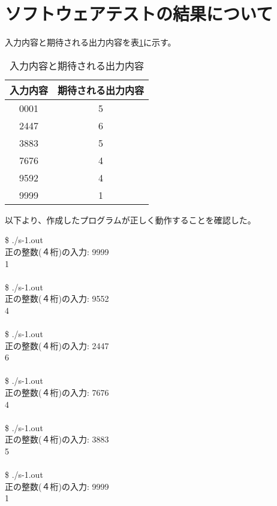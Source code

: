 

\section{ソフトウェアテストの結果について}
入力内容と期待される出力内容を表\ref{入力内容と期待される出力内容}に示す。

\begin{table}[H]
    \centering
    \caption{入力内容と期待される出力内容}
    \label{入力内容と期待される出力内容}
        \begin{tabular}{|c|c|} \hline
            入力内容 & 期待される出力内容 \\ \hline
            0001 & 5 \\
            2447 & 6 \\
            3883 & 5 \\
            7676 & 4 \\
            9592 & 4 \\
            9999 & 1 \\ \hline
        \end{tabular}
\end{table}

以下より、作成したプログラムが正しく動作することを確認した。

\$ ./s-1.out \\
正の整数(４桁)の入力: 9999 \\
1 \\
\\
\$ ./s-1.out \\ 
正の整数(４桁)の入力: 9552 \\ 
4 \\
\\
\$ ./s-1.out \\
正の整数(４桁)の入力: 2447 \\
6 \\
\\
\$ ./s-1.out \\
正の整数(４桁)の入力: 7676 \\
4 \\
\\
\$ ./s-1.out \\
正の整数(４桁)の入力: 3883 \\
5 \\
\\
\$ ./s-1.out \\
正の整数(４桁)の入力: 9999 \\
1 \\



